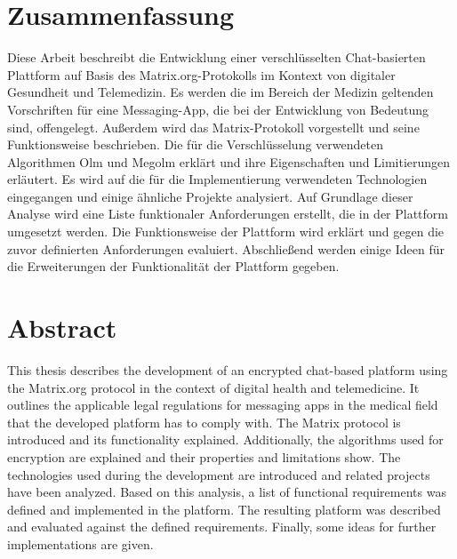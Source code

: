 \makeatother

\newcommand\ProcessThreeDashes{\llap{\color{cyan}\mdseries-{-}-}}




    \nocite{*}


    \frontmatter
    
    \hypersetup{pageanchor=false}

    \newpage
    \section*{Zusammenfassung}
    Diese Arbeit beschreibt die Entwicklung einer verschlüsselten Chat-basierten Plattform auf Basis des Matrix.org-Protokolls im Kontext von digitaler Gesundheit und Telemedizin.
    Es werden die im Bereich der Medizin geltenden Vorschriften für eine Messaging-App, die bei der Entwicklung von Bedeutung sind, offengelegt.
    Außerdem wird das Matrix-Protokoll vorgestellt und seine Funktionsweise beschrieben.
    Die für die Verschlüsselung verwendeten Algorithmen Olm und Megolm erklärt und ihre Eigenschaften und Limitierungen erläutert.
    Es wird auf die für die Implementierung verwendeten Technologien eingegangen und einige ähnliche Projekte analysiert.
    Auf Grundlage dieser Analyse wird eine Liste funktionaler Anforderungen erstellt, die in der Plattform umgesetzt werden.
    Die Funktionsweise der Plattform wird erklärt und gegen die zuvor definierten Anforderungen evaluiert.
    Abschließend werden einige Ideen für die Erweiterungen der Funktionalität der Plattform gegeben.


    \section*{Abstract}\label{sec:abstract}
    This thesis describes the development of an encrypted chat-based platform using the Matrix.org protocol in the context of digital health and telemedicine.
    It outlines the applicable legal regulations for messaging apps in the medical field that the developed platform has to comply with.
    The Matrix protocol is introduced and its functionality explained.
    Additionally, the algorithms used for encryption are explained and their properties and limitations show.
    The technologies used during the development are introduced and related projects have been analyzed.
    Based on this analysis, a list of functional requirements was defined and implemented in the platform.
    The resulting platform was described and evaluated against the defined requirements.
    Finally, some ideas for further implementations are given.

